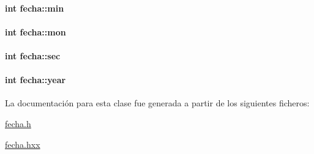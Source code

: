 \paragraph[{min}]{\setlength{\rightskip}{0pt plus 5cm}int fecha\+::min\hspace{0.3cm}{\ttfamily [private]}}\label{classfecha_a3875f28ff6e7c383923c80e86afaec2e}
\hypertarget{classfecha_a5c86be74f1215600f99798d54126ba16}{}
\paragraph[{mon}]{\setlength{\rightskip}{0pt plus 5cm}int fecha\+::mon\hspace{0.3cm}{\ttfamily [private]}}\label{classfecha_a5c86be74f1215600f99798d54126ba16}
\hypertarget{classfecha_a09eb9f4865c9ff896f438b8df3cf6485}{}
\paragraph[{sec}]{\setlength{\rightskip}{0pt plus 5cm}int fecha\+::sec\hspace{0.3cm}{\ttfamily [private]}}\label{classfecha_a09eb9f4865c9ff896f438b8df3cf6485}
\hypertarget{classfecha_a4d06534f05a6350ae229ce2b17b860e8}{}
\paragraph[{year}]{\setlength{\rightskip}{0pt plus 5cm}int fecha\+::year\hspace{0.3cm}{\ttfamily [private]}}\label{classfecha_a4d06534f05a6350ae229ce2b17b860e8}


La documentación para esta clase fue generada a partir de los siguientes ficheros\+:\begin{DoxyCompactItemize}
\item 
\hyperlink{fecha_8h}{fecha.\+h}\item 
\hyperlink{fecha_8hxx}{fecha.\+hxx}\end{DoxyCompactItemize}
